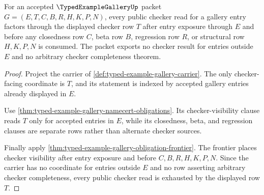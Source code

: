 \begin{theorem}
\label{thm:typed-example-gallery-checker-row-exhaustion}
For an accepted $\TypedExampleGalleryUp$ packet $G=(E,T,C,B,R,H,K,P,N)$, every public checker read for a gallery entry factors through the displayed checker row $T$ after entry exposure through $E$ and before any closedness row $C$, beta row $B$, regression row $R$, or structural row $H,K,P,N$ is consumed. The packet exports no checker result for entries outside $E$ and no arbitrary checker completeness theorem.
\end{theorem}
\begin{proof}
Project the carrier of \autoref{def:typed-example-gallery-carrier}. The only checker-facing coordinate is $T$, and its statement is indexed by accepted gallery entries already displayed in $E$.

Use \autoref{thm:typed-example-gallery-namecert-obligations}. Its checker-visibility clause reads $T$ only for accepted entries in $E$, while its closedness, beta, and regression clauses are separate rows rather than alternate checker sources.

Finally apply \autoref{thm:typed-example-gallery-obligation-frontier}. The frontier places checker visibility after entry exposure and before $C,B,R,H,K,P,N$. Since the carrier has no coordinate for entries outside $E$ and no row asserting arbitrary checker completeness, every public checker read is exhausted by the displayed row $T$.
\end{proof}

